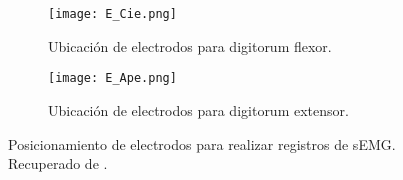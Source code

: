 \begin{figure}[htbp]
	\centering
	\begin{subfigure}[htbp]{0.3\textwidth}
		\texttt{[image: E\_Cie.png]}
		\caption{Ubicación de electrodos para digitorum flexor.}
		\label{Figura: E_Cie}
	\end{subfigure}
	\hfill
	\begin{subfigure}[htbp]{0.3\textwidth}
		\texttt{[image: E\_Ape.png]}
		\caption{Ubicación de electrodos para digitorum extensor.}
		\label{Figura: E_Ape}
	\end{subfigure}
	\caption{Posicionamiento de electrodos para realizar registros de sEMG. Recuperado de \cite{Cavalcanti-Garcia2009}.}
	\label{Figura: E_sEMG}
\end{figure}


